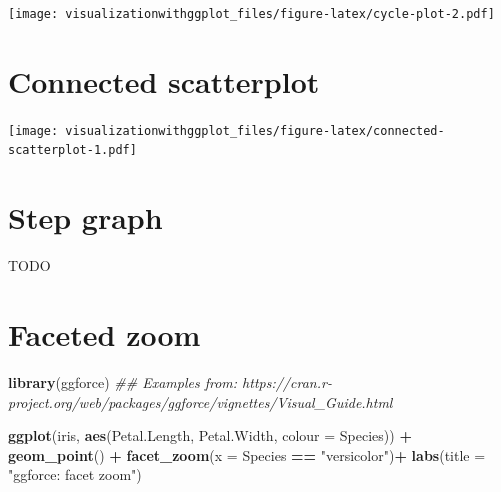 \documentclass[]{krantz}
\makeatletter
\newenvironment{Shaded}{\begin{snugshade}}{\end{snugshade}}
\newcommand{\CommentTok}[1]{\textcolor[rgb]{0.56,0.35,0.01}{\textit{#1}}}
\newcommand{\DataTypeTok}[1]{\textcolor[rgb]{0.13,0.29,0.53}{#1}}
\newcommand{\KeywordTok}[1]{\textcolor[rgb]{0.13,0.29,0.53}{\textbf{#1}}}
\newcommand{\NormalTok}[1]{#1}
\newcommand{\OperatorTok}[1]{\textcolor[rgb]{0.81,0.36,0.00}{\textbf{#1}}}
\newcommand{\StringTok}[1]{\textcolor[rgb]{0.31,0.60,0.02}{#1}}
\newenvironment{kframe}{%
\medskip{}
\setlength{\fboxsep}{.8em}
 \def\at@end@of@kframe{}%
 \ifinner\ifhmode%
  \def\at@end@of@kframe{\end{minipage}}%
  \begin{minipage}{\columnwidth}%
 \fi\fi%
 \def\FrameCommand##1{\hskip\@totalleftmargin \hskip-\fboxsep
 \colorbox{shadecolor}{##1}\hskip-\fboxsep
     \hskip-\linewidth \hskip-\@totalleftmargin \hskip\columnwidth}%
 \MakeFramed {\advance\hsize-\width
   \@totalleftmargin\z@ \linewidth\hsize
   \@setminipage}}%
 {\par\unskip\endMakeFramed%
 \at@end@of@kframe}
\renewenvironment{Shaded}{\begin{kframe}}{\end{kframe}}
\makeatother
\begin{document}
\texttt{[image: visualizationwithggplot\_files/figure-latex/cycle-plot-2.pdf]}

\hypertarget{connected-scatterplot}{%
\section{Connected scatterplot}\label{connected-scatterplot}}

\begin{Shaded}
\end{Shaded}

\texttt{[image: visualizationwithggplot\_files/figure-latex/connected-scatterplot-1.pdf]}

\hypertarget{step-graph}{%
\section{Step graph}\label{step-graph}}

TODO

\hypertarget{faceted-zoom}{%
\section{Faceted zoom}\label{faceted-zoom}}

\begin{Shaded}
\begin{Highlighting}[]
\KeywordTok{library}\NormalTok{(ggforce)}
\CommentTok{## Examples from: https://cran.r-project.org/web/packages/ggforce/vignettes/Visual_Guide.html}

\KeywordTok{ggplot}\NormalTok{(iris, }\KeywordTok{aes}\NormalTok{(Petal.Length, Petal.Width, }\DataTypeTok{colour =}\NormalTok{ Species)) }\OperatorTok{+}
\StringTok{    }\KeywordTok{geom_point}\NormalTok{() }\OperatorTok{+}
\StringTok{    }\KeywordTok{facet_zoom}\NormalTok{(}\DataTypeTok{x =}\NormalTok{ Species }\OperatorTok{==}\StringTok{ "versicolor"}\NormalTok{)}\OperatorTok{+}
\StringTok{    }\KeywordTok{labs}\NormalTok{(}\DataTypeTok{title =} \StringTok{"ggforce: facet zoom"}\NormalTok{)}
\end{Highlighting}
\end{Shaded}
\end{document}

